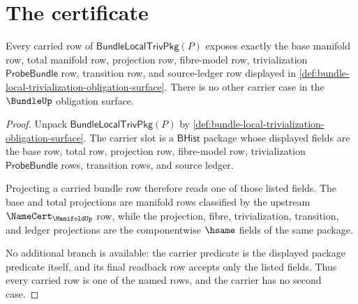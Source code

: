 \section{The certificate}
\label{sec:bundle-certificate}

\begin{theorem}
\label{thm:bundle-carrier-projection-obligation}
Every carried row of $\mathsf{BundleLocalTrivPkg}(P)$ exposes exactly the
base manifold row, total manifold row, projection row, fibre-model row,
trivialization $\mathsf{ProbeBundle}$ row, transition row, and source-ledger
row displayed in
\autoref{def:bundle-local-trivialization-obligation-surface}. There is no
other carrier case in the $\BundleUp$ obligation surface.
\end{theorem}
\begin{proof}
Unpack $\mathsf{BundleLocalTrivPkg}(P)$ by
\autoref{def:bundle-local-trivialization-obligation-surface}. The carrier
slot is a $\mathsf{BHist}$ package whose displayed fields are the base row,
total row, projection row, fibre-model row, trivialization
$\mathsf{ProbeBundle}$ rows, transition rows, and source ledger.

Projecting a carried bundle row therefore reads one of those listed fields.
The base and total projections are manifold rows classified by the upstream
$\NameCert_{\ManifoldUp}$ row, while the projection, fibre, trivialization,
transition, and ledger projections are the componentwise $\hsame$ fields of
the same package.

No additional branch is available: the carrier predicate is the displayed
package predicate itself, and its final readback row accepts only the listed
fields. Thus every carried row is one of the named rows, and the carrier has no
second case.
\end{proof}

